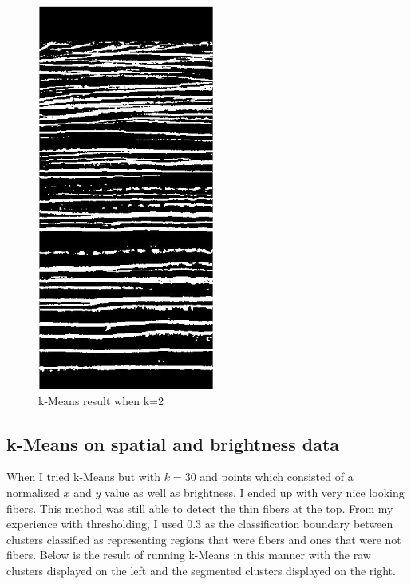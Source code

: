 \documentclass[11pt,psfig]{article}
\begin{document}
\begin{figure}[H]
\centering
\includegraphics[height=5in]{Initial_kMeansSegmentationResult.jpg}
\caption{k-Means result when k=2}
\end{figure}

\subsection{k-Means on spatial and brightness data}

When I tried k-Means but with $k=30$ and points which consisted of a normalized $x$ and $y$ value as well as brightness, I ended up with very nice looking fibers. This method was still able to detect the thin fibers at the top. From my experience with thresholding, I used $0.3$ as the classification boundary between clusters classified as representing regions that were fibers and ones that were not fibers. Below is the result of running k-Means in this manner with the raw clusters displayed on the left and the segmented clusters displayed on the right.
\end{document}
